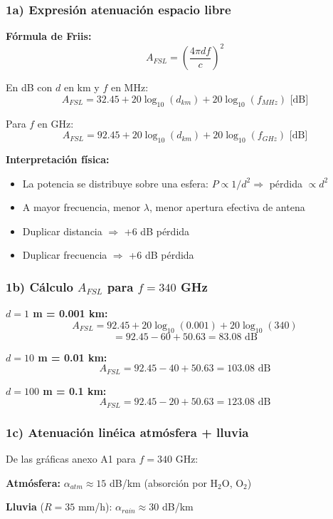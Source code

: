 \documentclass[a4paper,10pt]{article}
\begin{document}
\subsubsection{1a) Expresión atenuación espacio libre}

\textbf{Fórmula de Friis:}
$$A_{FSL} = \left(\frac{4\pi d f}{c}\right)^2$$

En dB con $d$ en km y $f$ en MHz:
$$\boxed{A_{FSL} = 32.45 + 20\log_{10}(d_{km}) + 20\log_{10}(f_{MHz}) \text{ [dB]}}$$

Para $f$ en GHz:
$$\boxed{A_{FSL} = 92.45 + 20\log_{10}(d_{km}) + 20\log_{10}(f_{GHz}) \text{ [dB]}}$$

\textbf{Interpretación física:}
\begin{itemize}
    \item La potencia se distribuye sobre una esfera: $P \propto 1/d^2 \Rightarrow$ pérdida $\propto d^2$
    \item A mayor frecuencia, menor $\lambda$, menor apertura efectiva de antena
    \item Duplicar distancia $\Rightarrow$ +6 dB pérdida
    \item Duplicar frecuencia $\Rightarrow$ +6 dB pérdida
\end{itemize}

\subsubsection{1b) Cálculo $A_{FSL}$ para $f = 340$ GHz}

\textbf{$d = 1$ m = 0.001 km:}
$$A_{FSL} = 92.45 + 20\log_{10}(0.001) + 20\log_{10}(340)$$
$$= 92.45 - 60 + 50.63 = \boxed{83.08 \text{ dB}}$$

\textbf{$d = 10$ m = 0.01 km:}
$$A_{FSL} = 92.45 - 40 + 50.63 = \boxed{103.08 \text{ dB}}$$

\textbf{$d = 100$ m = 0.1 km:}
$$A_{FSL} = 92.45 - 20 + 50.63 = \boxed{123.08 \text{ dB}}$$

\subsubsection{1c) Atenuación linéica atmósfera + lluvia}

De las gráficas anexo A1 para $f = 340$ GHz:

\textbf{Atmósfera:} $\alpha_{atm} \approx 15$ dB/km (absorción por H$_2$O, O$_2$)

\textbf{Lluvia} ($R = 35$ mm/h): $\alpha_{rain} \approx 30$ dB/km
\end{document}
